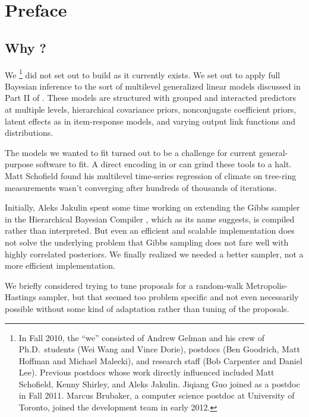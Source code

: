 \chapter*{Preface}

\section*{Why \Stan?}

We%
%
\footnote{In Fall 2010, the ``we'' consisted of Andrew Gelman and his
  crew of Ph.D.\ students (Wei Wang and Vince Dorie), postdocs (Ben
  Goodrich, Matt Hoffman and Michael Malecki), and research staff (Bob
  Carpenter and Daniel Lee).  Previous postdocs whose work directly
  influenced \Stan included Matt Schofield, Kenny Shirley, and
  Aleks Jakulin.  Jiqiang Guo joined as a postdoc in Fall 2011.
  Marcus Brubaker, a computer science postdoc at University of
  Toronto, joined the development team in early 2012.}
%
did not set out to build \Stan as it currently exists.  We set out to
apply full Bayesian inference to the sort of multilevel generalized
linear models discussed in Part II of \citep{GelmanHill:2007}.  These
models are structured with grouped and interacted predictors at
multiple levels, hierarchical covariance priors, nonconjugate
coefficient priors, latent effects as in item-response models, and
varying output link functions and distributions.

The models we wanted to fit turned out to be a challenge for current
general-purpose software to fit.  A direct encoding in \BUGS or \JAGS
can grind these tools to a halt.  Matt Schofield found his multilevel
time-series regression of climate on tree-ring measurements wasn't
converging after hundreds of thousands of iterations.

Initially, Aleks Jakulin spent some time working on extending the
Gibbs sampler in the Hierarchical Bayesian Compiler
\citep{DaumeIII:2007}, which as its name suggests, is compiled rather
than interpreted.  But even an efficient and scalable implementation
does not solve the underlying problem that Gibbs sampling does not
fare well with highly correlated posteriors.  We finally realized we
needed a better sampler, not a more efficient implementation.

We briefly considered trying to tune proposals for a random-walk
Metropolis-Hastings sampler, but that seemed too problem specific and
not even necessarily possible without some kind of adaptation rather
than tuning of the proposals. 
 

